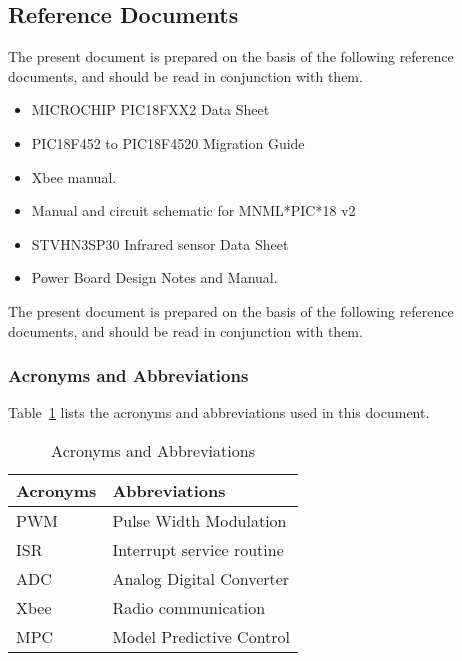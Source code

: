 \subsection{Reference Documents}
    The present document is prepared on the basis of the following reference documents, and should be read in conjunction with them.\\
    \begin {itemize}
    	\item  MICROCHIP PIC18FXX2 Data Sheet
    	\item  PIC18F452 to PIC18F4520 Migration Guide
    	\item Xbee manual.
    	\item Manual and circuit schematic for MNML*PIC*18 v2
    	\item STVHN3SP30 Infrared sensor Data Sheet
    	\item Power Board Design Notes and Manual.
    \end{itemize}  The present document is prepared on the basis of the following reference documents, and should be read in conjunction with them.\\
\subsubsection{ Acronyms and Abbreviations}
Table~\ref{Acro} lists the acronyms and abbreviations used in this document.
\begin{table}[h]
  \centering
  \caption{Acronyms and Abbreviations}
  \label{Acro}
	\begin{tabular}{| l | l | }
  	\hline
  	\textbf{Acronyms} & \textbf{Abbreviations}		\\ \hline
  	PWM	     & Pulse Width Modulation	\\ \hline
  	ISR      & Interrupt service routine \\ \hline
  	ADC      & Analog Digital Converter   \\ \hline
  	Xbee     & Radio communication	\\ \hline
    MPC      & Model Predictive Control \\
  	\hline
	\end{tabular}
\end{table}

